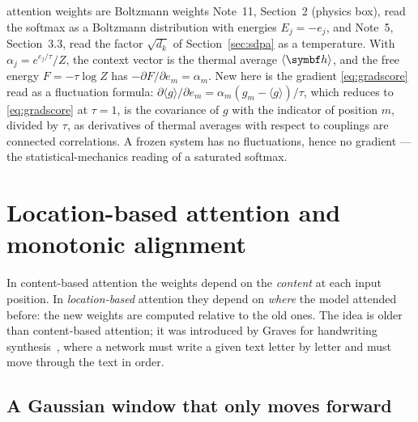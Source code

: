 \documentclass[11pt]{article}
\newcommand{\hv}{\vect{h}}
\begin{document}
\begin{physics}{attention weights are Boltzmann weights}
Note~11, Section~2 (physics box), read the softmax as a Boltzmann distribution with energies $E_j = -e_j$, and Note~5,
Section~3.3, read the factor $\sqrt{d_k}$ of Section~\ref{sec:sdpa} as a temperature. With $\alpha_j = e^{e_j/\tau}/Z$, the
context vector is the thermal average $\langle\hv\rangle$, and the free energy $F = -\tau\log Z$ has
$-\partial F/\partial e_m = \alpha_m$. New here is the gradient \eqref{eq:gradscore} read as a fluctuation formula: $\partial\langle g\rangle/\partial e_m = \alpha_m(g_m - \langle g\rangle)/\tau$, which reduces to
\eqref{eq:gradscore} at $\tau = 1$, is the covariance of $g$ with the indicator of position $m$, divided by $\tau$, as
derivatives of thermal averages with respect to couplings are connected correlations. A frozen system has no
fluctuations, hence no gradient --- the statistical-mechanics reading of a saturated softmax.
\end{physics}

\section{Location-based attention and monotonic alignment}\label{sec:location}

In content-based attention the weights depend on the \emph{content} at each input position. In \emph{location-based}
attention they depend on \emph{where} the model attended before: the new weights are computed relative to the old ones. The
idea is older than content-based attention; it was introduced by Graves for handwriting
synthesis~\cite{graves2013}, where a network must write a given text letter by letter and must move through the text in
order.

\subsection{A Gaussian window that only moves forward}\label{sec:graves}
\end{document}
